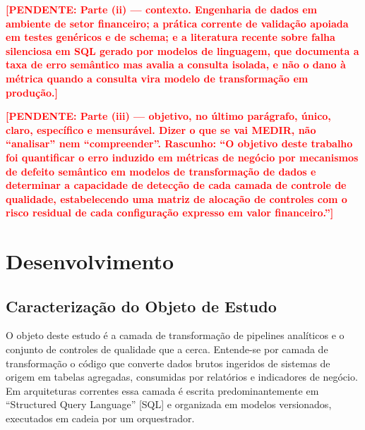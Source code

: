 \documentclass[11pt,a4paper]{article}
\newcommand{\estrangeiro}[1]{``#1''}
\newcommand{\pend}[1]{\textcolor{red}{\textbf{[PENDENTE: #1]}}}
\begin{document}
\pend{Parte (ii) --- contexto. Engenharia de dados em ambiente de setor
financeiro; a prática corrente de validação apoiada em testes genéricos e
de schema; e a literatura recente sobre falha silenciosa em SQL gerado
por modelos de linguagem, que documenta a taxa de erro semântico mas
avalia a consulta isolada, e não o dano à métrica quando a consulta vira
modelo de transformação em produção.}

\pend{Parte (iii) --- objetivo, no último parágrafo, único, claro,
específico e mensurável. Dizer o que se vai MEDIR, não ``analisar'' nem
``compreender''. Rascunho: ``O objetivo deste trabalho foi quantificar o
erro induzido em métricas de negócio por mecanismos de defeito semântico
em modelos de transformação de dados e determinar a capacidade de
detecção de cada camada de controle de qualidade, estabelecendo uma
matriz de alocação de controles com o risco residual de cada configuração
expresso em valor financeiro.''}

\section{Desenvolvimento}

\subsection{Caracterização do Objeto de Estudo}

O objeto deste estudo é a camada de transformação de pipelines analíticos
e o conjunto de controles de qualidade que a cerca. Entende-se por camada
de transformação o código que converte dados brutos ingeridos de sistemas
de origem em tabelas agregadas, consumidas por relatórios e indicadores de
negócio. Em arquiteturas correntes essa camada é escrita predominantemente
em \estrangeiro{Structured Query Language} [SQL] e organizada em modelos
versionados, executados em cadeia por um orquestrador.
\end{document}
